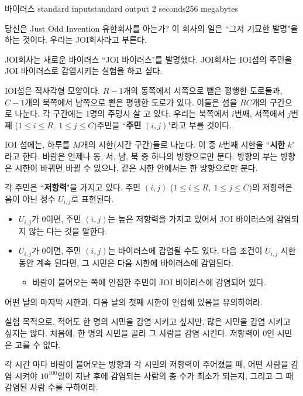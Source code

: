 \begin{problem}{바이러스}
	{standard input}{standard output}
	{2 seconds}{256 megabytes}{}
	
	당신은 Just Odd Invention 유한회사를 아는가? 이 회사의 일은 ``그저 기묘한 발명"을 하는 것이다. 우리는 JOI회사라고 부른다.
	
	JOI회사는 새로운 바이러스 ``JOI 바이러스"를 발명했다. JOI회사는 IOI섬의 주민을 JOI 바이러스로 감염시키는 실험을 하고 싶다.
	
	IOI섬은 직사각형 모양이다. $R-1$개의 동쪽에서 서쪽으로 뻗은 평행한 도로들과, $C-1$개의 북쪽에서 남쪽으로 뻗은 평행한 도로가 있다. 이들은 섬을 $RC$개의 구간으로 나눈다. 각 구간에는 1명의 주밍시 살 고 있다. 우리는 북쪽에서 $i$번째, 서쪽에서 $j$번째 ($1 \le i \le R, \ 1 \le j \le C$)주민을 ``\textbf{주민} $(i, j)$"라고 부를 것이다.
	
	IOI 섬에는, 하루를 $M$개의 시한(시간 구간)들로 나눈다. 이 중 $k$번째 시한을 ``\textbf{시한} $k$" 라고 한다. 바람은 언제나 동, 서, 남, 북 중 하나의 방향으로만 분다. 방향의 부는 방향은 시한이 바뀌면 바뀔 수 있으나, 같은 시한 안에서는 한 방향으로만 분다.
	
	각 주민은 ``\textbf{저항력}"을 가지고 있다. 주민 $(i, j)$ ($1 \le i \le R, \ 1 \le j \le C$)의 저항력은 음이 아닌 정수 $U_{i, j}$로 표현된다.
	
	
	\begin{itemize}
		\item $U_{i, j}$가 0이면, 주민 $(i, j)$는 높은 저항력을 가지고 있어서 JOI 바이러스에 감염되지 않는 다는 것을 말한다.
		\item $U_{i, j}$가 0이면, 주민 $(i, j)$는 바이러스에 감염될 수도 있다. 다음 조건이 $U_{i, j}$ 시한 동안 계속 된다면, 그 시민은 다음 시한에 바이러스에 감염된다.
		\begin{itemize}
			\item 바람이 불어오는 쪽에 인접한 주민이 JOI 바이러스에 감염되어 있다.
		\end{itemize}
	\end{itemize}

	어떤 날의 마지막 시한과, 다음 날의 첫째 시한이 인접해 있음을 유의하여라.
	
	실험 목적으로, 적어도 한 명의 시민을 감염 시키고 싶지만, 많은 시민을 감염 시키고 싶지는 않다. 처음에, 한 명의 시민을 골라 그 사람을 감염 시킨다. 저항력이 0인 시민은 고를 수 없다.
	
	각 시간 마다 바람이 불어오는 방향과 각 시민의 저항력이 주어졌을 때, 어떤 사람을 감염 시켜야 $10^{100}$일이 지난 후에 감염되는 사람의 총 수가 최소가 되는지, 그리고 그 때 감염된 사람 수를 구하여라.
	

\end{problem}
